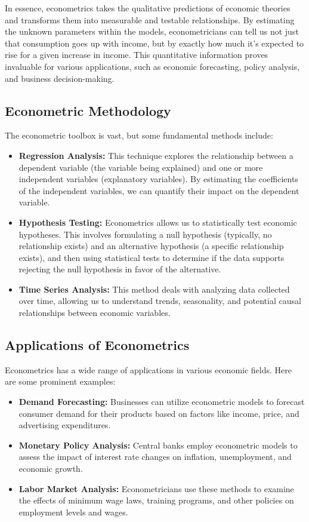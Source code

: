 \documentclass[
  letterpaper,
  paper =a4,
  twoside,
  openright,
  headsepline,
  footsepline,
  listof = totocnumbered,
  chapterprefix = true,
  firstiscover,
  parskip = full*]{scrbook}
\begin{document}
In essence, econometrics takes the qualitative predictions of economic
theories and transforms them into measurable and testable relationships.
By estimating the unknown parameters within the models, econometricians
can tell us not just that consumption goes up with income, but by
exactly how much it's expected to rise for a given increase in income.
This quantitative information proves invaluable for various
applications, such as economic forecasting, policy analysis, and
business decision-making.

\subsection{Econometric Methodology}\label{econometric-methodology}

The econometric toolbox is vast, but some fundamental methods include:

\begin{itemize}
\item
  \textbf{Regression Analysis:} This technique explores the relationship
  between a dependent variable (the variable being explained) and one or
  more independent variables (explanatory variables). By estimating the
  coefficients of the independent variables, we can quantify their
  impact on the dependent variable.
\item
  \textbf{Hypothesis Testing:} Econometrics allows us to statistically
  test economic hypotheses. This involves formulating a null hypothesis
  (typically, no relationship exists) and an alternative hypothesis (a
  specific relationship exists), and then using statistical tests to
  determine if the data supports rejecting the null hypothesis in favor
  of the alternative.
\item
  \textbf{Time Series Analysis:} This method deals with analyzing data
  collected over time, allowing us to understand trends, seasonality,
  and potential causal relationships between economic variables.
\end{itemize}

\subsection{Applications of
Econometrics}\label{applications-of-econometrics}

Econometrics has a wide range of applications in various economic
fields. Here are some prominent examples:

\begin{itemize}
\item
  \textbf{Demand Forecasting:} Businesses can utilize econometric models
  to forecast consumer demand for their products based on factors like
  income, price, and advertising expenditures.
\item
  \textbf{Monetary Policy Analysis:} Central banks employ econometric
  models to assess the impact of interest rate changes on inflation,
  unemployment, and economic growth.
\item
  \textbf{Labor Market Analysis:} Econometricians use these methods to
  examine the effects of minimum wage laws, training programs, and other
  policies on employment levels and wages.
\end{itemize}
\end{document}
